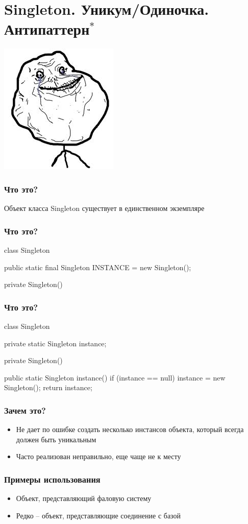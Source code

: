 \documentclass[russian,aspectratio=169,14pt]{beamer}
\begin{document}
\section{Singleton. Уникум/Одиночка. Антипаттерн$^*$}

\begin{frame}
    \begin{center}
	\includegraphics[height=0.8\textheight]{singleton.jpeg}
	\end{center}
\end{frame}

\begin{frame}
	\frametitle{Что это?}
	Объект класса Singleton существует в единственном экземпляре
\end{frame}

\begin{frame}[fragile]
	\frametitle{Что это?}
	\begin{listjava}
class Singleton {
    public static final Singleton INSTANCE = new Singleton();
    
    private Singleton() {}
}
	\end{listjava}
\end{frame}

\begin{frame}[fragile]
	\frametitle{Что это?}
	\begin{listjava}
class Singleton {
    private static Singleton instance;
    
    private Singleton() {}
    
    public static Singleton instance() {
        if (instance == null) {
            instance = new Singleton();
        }
        return instance;
    }
}
	\end{listjava}
\end{frame}

\begin{frame}
	\frametitle{Зачем это?}
	\begin{itemize}
		\item Не дает по ошибке создать несколько инстансов объекта, который всегда должен быть уникальным
		\pause
		\item Часто реализован неправильно, еще чаще не к месту
	\end{itemize}
\end{frame}

\begin{frame}
	\frametitle{Примеры использования}
	\begin{itemize}
		\item Объект, представляющий фаловую систему
		\item Редко -- объект, представляющие соединение с базой
	\end{itemize}
\end{frame}


\questions
\end{document}

